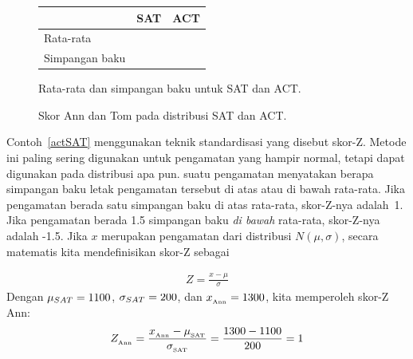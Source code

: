 \begin{figure}[h]
\centering
\begin{tabular}{l r r}
  \hline
  & SAT & ACT \\
  \hline
  Rata-rata \hspace{0.3cm} & \satmean{} & \actmean{} \\
  Simpangan baku & \satsd{} & \actsd{} \\
  \hline
\end{tabular}
\caption{Rata-rata dan simpangan baku untuk SAT dan ACT.}
\label{satACTstats}
\end{figure}

\begin{figure}
  \centering
  \caption{Skor Ann dan Tom pada distribusi SAT dan ACT.}
  \label{satActNormals}
\end{figure}

\begingroup
{}
Contoh~\ref{actSAT} menggunakan teknik standardisasi yang disebut
skor-Z. Metode ini paling sering digunakan untuk pengamatan yang
hampir normal, tetapi dapat digunakan pada distribusi apa pun.
 suatu pengamatan menyatakan
berapa simpangan baku letak pengamatan tersebut
di atas atau di bawah rata-rata.
Jika pengamatan berada satu simpangan baku di atas rata-rata,
skor-Z-nya adalah~1.
Jika pengamatan berada 1.5 simpangan baku \emph{di bawah} rata-rata,
skor-Z-nya adalah -1.5.
Jika $x$ merupakan pengamatan dari distribusi $N(\mu, \sigma)$,
secara matematis kita mendefinisikan skor-Z sebagai
\par
\endgroup
\begin{align*}
Z = \frac{x - \mu}{\sigma}
\end{align*}
Dengan $\mu_{SAT} = 1100{}$, $\sigma_{SAT} = 200{}$,
dan $x_{_{\text{Ann}}} = 1300{}$, kita memperoleh skor-Z Ann:
\begin{align*}
Z_{_{\text{Ann}}}
  = \frac{x_{_{\text{Ann}}} - \mu_{_{\text{SAT}}}}
      {\sigma_{_{\text{SAT}}}}
  = \frac{1300{} - 1100{}}{200{}}
  = 1{}
\end{align*}

